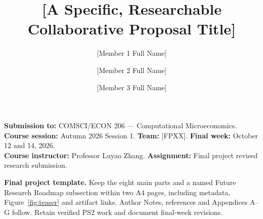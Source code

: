 \documentclass[sigconf,nonacm,10pt]{acmart}
\title{[A Specific, Researchable Collaborative Proposal Title]}
\author{[Member 1 Full Name]}
\affiliation{\institution{Duke Kunshan University}\city{Kunshan}\country{China}}
\author{[Member 2 Full Name]}
\affiliation{\institution{Duke Kunshan University}\city{Kunshan}\country{China}}
\author{[Member 3 Full Name]}
\affiliation{\institution{Duke Kunshan University}\city{Kunshan}\country{China}}
\newcommand{\CourseNumber}{COMSCI/ECON 206}
\newcommand{\CourseName}{Computational Microeconomics}
\newcommand{\CourseSession}{Autumn 2026 Session 1}
\newcommand{\Instructor}{Professor Luyao Zhang}
\newcommand{\TeamCode}{[FPXX]}
\newcommand{\coursemeta}{\noindent\textbf{Submission to:} \CourseNumber{} --- \CourseName.\\
\textbf{Course session:} \CourseSession. \textbf{Team:} \TeamCode. \textbf{Final week:} October 12 and 14, 2026.\\
\textbf{Course instructor:} \Instructor. \textbf{Assignment:} Final project revised research submission.\par\smallskip}
\begin{document}
\begin{teaserfigure}
\captionsetup{skip=8pt}
\centering

\caption{One integrated final-project evidence chain. Economic reasoning defines the strategic question and institutional objective; reproducible computation tests the model; behavioral evidence probes assumptions; the A0 poster communicates the combined claim and its practical implications for a concrete real-world case. Replace every placeholder and distinguish completed evidence from planned work.}
\label{fig:teaser}
\end{teaserfigure}
\maketitle\raggedbottom\coursemeta

\noindent\textbf{Final project template.} Keep the eight main parts and a named Future Research Roadmap subsection within two A4 pages, including metadata, Figure~\ref{fig:teaser} and artifact links. Author Notes, references and Appendices A--G follow. Retain verified PS2 work and document final-week revisions.



\end{document}
